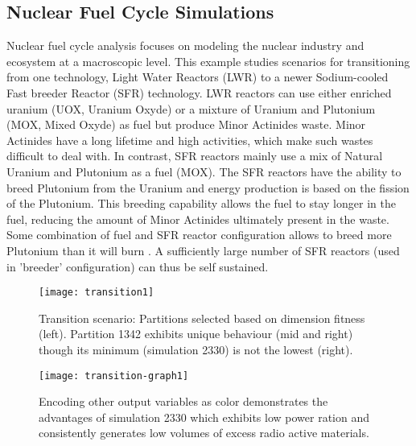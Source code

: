 \subsection{Nuclear Fuel Cycle Simulations}
\label{sec:nuclear}
Nuclear fuel cycle analysis focuses on modeling the nuclear industry and ecosystem at a macroscopic level. This example studies scenarios for transitioning from one technology, Light Water Reactors (LWR) to a newer Sodium-cooled Fast breeder Reactor (SFR) technology. LWR reactors can use either enriched uranium (UOX, Uranium Oxyde) or a mixture of Uranium and Plutonium (MOX, Mixed Oxyde) as fuel but produce Minor Actinides waste. Minor Actinides have a long lifetime and high activities, which make such wastes  difficult to deal with. In contrast, SFR reactors mainly use a mix of Natural Uranium and Plutonium as a fuel (MOX). The SFR reactors have the ability to breed Plutonium from the Uranium and energy production is based on the fission of the Plutonium. This breeding capability allows the fuel to stay longer in the fuel, reducing the amount of Minor Actinides ultimately present in the waste. Some combination of fuel and SFR reactor configuration allows to breed more Plutonium than it will burn . A sufficiently large number of SFR reactors (used in 'breeder' configuration) can thus be self sustained.

\begin{figure}[b]
    \begin{center}
     \texttt{[image: transition1]}
    \caption{Transition scenario: Partitions selected based on dimension fitness (left). Partition 1342 exhibits unique behaviour (mid and right) though its minimum (simulation 2330) is not the lowest (right).}
        \vspace{-.1in}
    \label{fig:transition}
    \end{center}
\end{figure}

\begin{figure}[tb]
    \begin{center}
    \vspace{-.1in}
     \texttt{[image: transition-graph1]}
    \caption{Encoding other output variables as color demonstrates the advantages of simulation 2330 which exhibits low power ration and consistently generates low volumes of excess radio active materials.}
    \label{fig:transition-graph}
    \end{center}
\end{figure}

